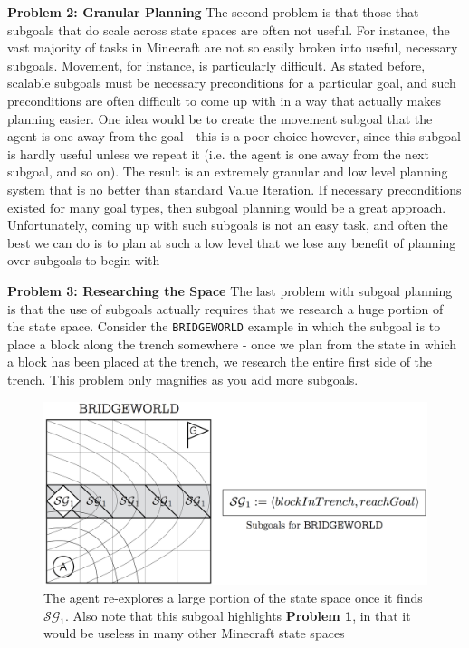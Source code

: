 \documentclass[]{article}
\begin{document}
{\bf Problem 2: Granular Planning} The second problem is that those that subgoals that do scale across state spaces are often not useful. For instance, the vast majority of tasks in Minecraft are not so easily broken into useful, necessary subgoals. Movement, for instance, is particularly difficult. As stated before, scalable subgoals must be necessary preconditions for a particular goal, and such preconditions are often difficult to come up with in a way that actually makes planning easier. One idea would be to create the movement subgoal that the agent is one away from the goal - this is a poor choice however, since this subgoal is hardly useful unless we repeat it (i.e. the agent is one away from the next subgoal, and so on). The result is an extremely granular and low level planning system that is no better than standard Value Iteration. If necessary preconditions existed for many goal types, then subgoal planning would be a great approach. Unfortunately, coming up with such subgoals is not an easy task, and often the best we can do is to plan at such a low level that we lose any benefit of planning over subgoals to begin with


{\bf Problem 3: Researching the Space} The last problem with subgoal planning is that the use of subgoals actually requires that we research a huge portion of the state space. Consider the \texttt{BRIDGEWORLD} example in which the subgoal is to place a block along the trench somewhere - once we plan from the state in which a block has been placed at the trench, we research the entire first side of the trench. This problem only magnifies as you add more subgoals.

\begin{figure}
\centering
\includegraphics[scale=0.22]{figures/bridgeworld_sg.png}
\caption{The agent re-explores a large portion of the state space once it finds $\mathcal{SG}_1$. Also note that this subgoal highlights {\bf Problem 1}, in that it would be useless in many other Minecraft state spaces}
\end{figure}
\end{document}
